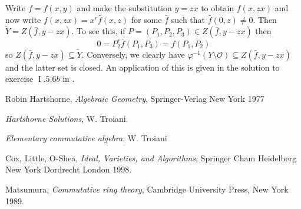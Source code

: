 \documentclass[12pt]{article}
\theoremstyle{plain}
\theoremstyle{definition}
\newcommand{\call}[1]{\mathcal{#1}}
\begin{document}
Write $f = f(x,y)$ and make the substitution $y = zx$ to obtain $f(x,zx)$ and now write $f(x,zx) = x^r\bar{f}(x,z)$ for some $\bar{f}$ such that $\bar{f}(0,z) \neq 0$. Then $\tilde{Y} = Z(\bar{f},y - zx)$. To see this, if $P = (P_1,P_2,P_3) \in Z(\bar{f},y - zx)$ then 
\[0= P_2^r\bar{f}(P_1,P_3) = f(P_1,P_2)\]
so $Z(\bar{f},y - zx) \subseteq \tilde{Y}$. Conversely, we clearly have $\varphi^{-1}(Y\setminus\call{O}) \subseteq Z(\bar{f},y - zx)$
 and the latter set is closed. An application of this is given in the solution to exercise $\operatorname{I}.5.6b$ in \cite{hartshorne_solutions}.























\begin{thebibliography}{9}
 Robin Hartshorne, \emph{Algebraic Geometry}, Springer-Verlag New York 1977

 \emph{Hartshorne Solutions}, W. Troiani.

 \emph{Elementary commutative algebra}, W. Troiani

 Cox, Little, O-Shea, \emph{Ideal, Varieties, and Algorithms}, Springer Cham Heidelberg New York Dordrecht London 1998.

 Matsumura, \emph{Commutative ring theory}, Cambridge University Press, New York 1989.

\end{thebibliography}
\end{document}
